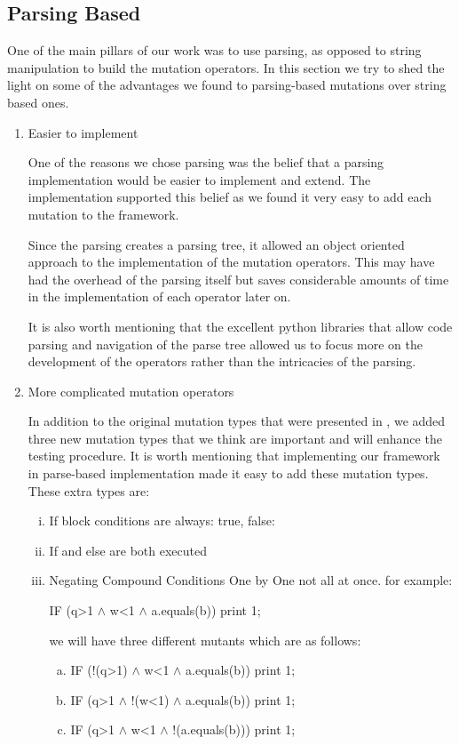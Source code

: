 \documentclass{acm_proc_article-sp}
\begin{document}
\subsection{Parsing Based}

One of the main pillars of our work was to use parsing, as opposed to string manipulation to build the mutation operators. In this section we try to shed the light on some of the advantages we found to parsing-based mutations over string based ones.

\begin{enumerate}
\item Easier to implement

One of the reasons we chose parsing was the belief that a parsing implementation would be easier to implement and extend. The implementation supported this belief as we found it very easy to add each mutation to the framework.

Since the parsing creates a parsing tree, it allowed an object oriented approach to the implementation of the mutation operators. This may have had the overhead of the parsing itself but saves considerable amounts of time in the implementation of each operator later on.

It is also worth mentioning that the excellent python libraries that allow code parsing and navigation of the parse tree allowed us to focus more on the development of the operators rather than the intricacies of the parsing.

\item More complicated mutation operators

In addition to the original mutation types that were presented in \cite{a2}, we added three new mutation types that we think are important and will enhance the testing procedure. It is worth mentioning that implementing our framework in parse-based implementation made it easy to add these mutation types. These extra types are:

\begin{enumerate}[i)]
\item If block conditions are always: true, false:     
\item If and else are both executed		
\item Negating Compound Conditions One by One not all at once. for example: 

IF (q>1 $\wedge$ w<1 $\wedge$ a.equals(b)) print 1;

we will have three different mutants which are as follows:
\begin{enumerate}[a)]
\item IF (!(q>1) $\wedge$ w<1 $\wedge$ a.equals(b)) print 1;
\item IF (q>1 $\wedge$ !(w<1) $\wedge$ a.equals(b)) print 1;
\item IF (q>1 $\wedge$ w<1 $\wedge$ !(a.equals(b))) print 1; 
\end{enumerate}

\end{enumerate}

\end{enumerate}
\end{document}
